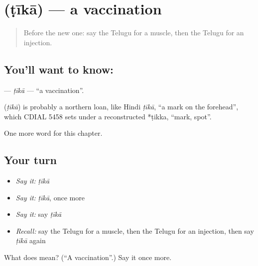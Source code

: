 \section[\texorpdfstring{\te{టీకా} (ṭīkā)}{టీకా (ṭīkā)}]{ (ṭīkā) — a vaccination}

\label{lesson:TE-C251-tika}



\begin{quote}
Before the new one: say the Telugu for a muscle, then the Telugu for an injection.
\end{quote}

\subsection*{You'll want to know: }
\textbf{} — \emph{ṭīkā} — \textquotedblleft{}a vaccination\textquotedblright{}.

\begin{cousinweb}
\textbf{} (\emph{ṭīkā}) is probably a northern loan, like Hindi \emph{ṭīkā}, \textquotedblleft{}a mark on the forehead\textquotedblright{}, which CDIAL 5458 sets under a reconstructed *ṭikka, \textquotedblleft{}mark, spot\textquotedblright{}.
\end{cousinweb}

\begin{grammarlens}[title={What you've built}]
One more word for this chapter.
\end{grammarlens}

\subsection*{Your turn}
\begin{itemize}
\raggedright
  \item \emph{Say it:} \emph{ṭīkā}
  \item \emph{Say it:} \emph{ṭīkā}, once more
  \item \emph{Say it:} say \emph{ṭīkā}
  \item \emph{Recall:} say the Telugu for a muscle, then the Telugu for an injection, then say \emph{ṭīkā} again
\end{itemize}

\begin{tcolorbox}[breakable,colback=teal!4,colframe=teal!35!black,title={Before you move on}]
What does  mean? (\textquotedblleft{}A vaccination\textquotedblright{}.) Say it once more.
\end{tcolorbox}
